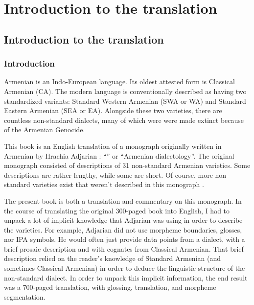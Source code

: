 \part{Introduction to the translation}




\chapter{Introduction to the translation}\label{chapter:HossepIntro}


\section{Introduction}

 

Armenian is an Indo-European language. Its oldest attested form is Classical Armenian (CA). The modern language is conventionally described as having two standardized variants: Standard Western Armenian (SWA or WA) and Standard Eastern Armenian (SEA or EA). Alongside these two varieties, there are countless non-standard dialects, many of which were were made extinct because of the Armenian Genocide. 

This book is an English translation of a monograph originally written in Armenian by Hrachia Adjarian \citep{Adjarian-1911-DialectologyBook}: ``'' or ``Armenian dialectology''. The original monograph consisted of descriptions of 31 non-standard Armenian varieties. Some descriptions are rather lengthy, while some are short.  Of course, more non-standard varieties exist that weren't described in this monograph  \citep{GreppinKhachaturian-1986-HandbookArmenianDialectology,Martirosyan-2019-Armeniandialects,Martirosyan-2019-ArmenianDialectsBigVersionRussianJournal,DolatianEtAl-prep-IranianGrammar}.

The present book is both a translation and commentary on this monograph. In the course of translating the original 300-paged book into English, I had to unpack a lot of implicit knowledge that Adjarian was using in order to describe the varieties. For example, Adjarian did not use morpheme boundaries, glosses, nor IPA symbols. He would often just provide data points from a dialect, with a brief prosaic description and with cognates from Classical Armenian. That brief description relied on the reader's knowledge of Standard Armenian (and sometimes Classical Armenian) in order to deduce the linguistic structure of the non-standard dialect. In order to unpack this implicit information, the end result was a 700-paged translation, with glossing, translation, and morpheme segmentation.


